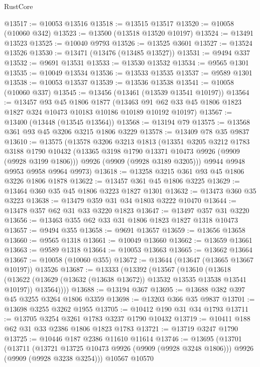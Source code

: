 \begin{lexlean}{RustCore}
\begin{coremodule}
@13517 := @10053 @13516
@13518 := @13515 @13517
@13520 := @10058 (@10060 @342)
@13523 := @13500 (@13518 @13520 @10197)
@13524 := @13491 @13523
@13525 := @10040 @9793
@13526 := @13525 @3601
@13527 := @13524 @13526
@13530 := @13471 (@13476 (@13485 @13527))
@13531 := @9494 @337
@13532 := @9691 @13531
@13533 := @13530 @13532
@13534 := @9565 @1301
@13535 := @10049 @13534
@13536 := @13533 @13535
@13537 := @9589 @1301
@13538 := @10053 @13537
@13539 := @13536 @13538
@13541 := @10058 (@10060 @337)
@13545 := @13456 (@13461 (@13539 @13541 @10197))
@13564 := @13457
    @93
    @45
    @1806
    @1877
    (@13463 @91 @62 @33 @45 @1806 @1823 @1827 @324 @10473 @10183 @10186 @10189 @10192 @10197)
@13567 := @13400 (@13448 (@13545 @13564))
@13568 := @13194 @79
@13575 := @13568 @361 @93 @45 @3206 @3215 @1806 @3229
@13578 := @13409 @78 @35 @9837
@13610 := @13575
    (@13578
      @3206
      @3213
      @1813
      (@13351
        @3205
        @3212
        @1783
        @3188
        @1790
        @10432
        (@13365 @3198 @1790 @13371 @10473 @9926 (@9909 (@9928 @3199 @1806)))
        @9926
        (@9909 (@9928 @3189 @3205)))
      @9944
      @9948
      @9953
      @9958
      @9964
      @9973)
@13618 := @13258 @3215 @361 @93 @45 @1806 @3226 @1806 @1878
@13622 := @13457 @361 @45 @1806 @3225
@13629 := @13464 @360 @35 @45 @1806 @3223 @1827 @1301
@13632 := @13473 @360 @35 @3223
@13638 := @13479 @359 @31 @34 @1803 @3222 @10470
@13644 := @13478 @357 @62 @31 @33 @3220 @1823
@13647 := @13497 @357 @31 @3220
@13656 := @13463 @355 @62 @33 @31 @1806 @1823 @1827 @1318 @10473
@13657 := @9494 @355
@13658 := @9691 @13657
@13659 := @13656 @13658
@13660 := @9565 @1318
@13661 := @10049 @13660
@13662 := @13659 @13661
@13663 := @9589 @1318
@13664 := @10053 @13663
@13665 := @13662 @13664
@13667 := @10058 (@10060 @355)
@13672 := @13644 (@13647 (@13665 @13667 @10197)) @13526
@13687 := @13333
    (@13392
      (@13567
        (@13610
          (@13618
            (@13622 (@13629 (@13632 (@13638 @13672)) @13532 @13535 @13538 @13541 @10197))
            @13564))))
@13688 := @13194 @367
@13695 := @13688 @382 @397 @45 @3255 @3264 @1806 @3359
@13698 := @13203 @366 @35 @9837
@13701 := @13698 @3255 @3262 @1955
@13705 := @10412 @190 @31 @34 @1793
@13711 := @13705 @3254 @3261 @1783 @3237 @1790 @10432
@13719 := @10411 @188 @62 @31 @33 @2386 @1806 @1823 @1783
@13721 := @13719 @3247 @1790
@13725 := @10446 @187 @2386 @11610 @11614
@13746 := @13695
    (@13701
      (@13711
        (@13721 @13725 @10473 @9926 (@9909 (@9928 @3248 @1806)))
        @9926
        (@9909 (@9928 @3238 @3254)))
      @10567
      @10570

\end{coremodule}
\end{lexlean}
